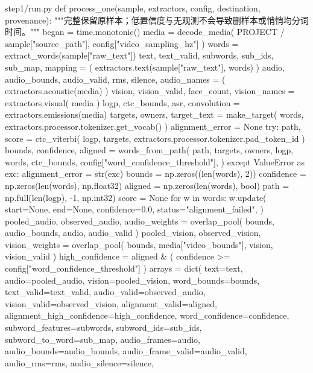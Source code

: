 \begin{appendices}
\begin{Python}{step1/run.py}
def process_one(sample, extractors, config, destination, provenance):
    """完整保留原样本；低置信度与无观测不会导致删样本或悄悄均分词时间。"""
    began = time.monotonic()
    media = decode_media(
        PROJECT / sample["source_path"], config["video_sampling_hz"]
    )
    words = extract_words(sample["raw_text"])
    text, text_valid, subwords, sub_ids, sub_map, mapping = (
        extractors.text(sample["raw_text"], words)
    )
    audio, audio_bounds, audio_valid, rms, silence, audio_names = (
        extractors.acoustic(media)
    )
    vision, vision_valid, face_count, vision_names = extractors.visual(
        media
    )
    logp, ctc_bounds, asr, convolution = extractors.emissions(media)
    targets, owners, target_text = make_target(
        words, extractors.processor.tokenizer.get_vocab()
    )
    alignment_error = None
    try:
        path, score = ctc_viterbi(
            logp, targets, extractors.processor.tokenizer.pad_token_id
        )
        bounds, confidence, aligned = words_from_path(
            path,
            targets,
            owners,
            logp,
            words,
            ctc_bounds,
            config["word_confidence_threshold"],
        )
    except ValueError as exc:
        alignment_error = str(exc)
        bounds = np.zeros((len(words), 2))
        confidence = np.zeros(len(words), np.float32)
        aligned = np.zeros(len(words), bool)
        path = np.full(len(logp), -1, np.int32)
        score = None
        for w in words:
            w.update(
                start=None,
                end=None,
                confidence=0.0,
                status="alignment_failed",
            )
    pooled_audio, observed_audio, audio_weights = overlap_pool(
        bounds, audio_bounds, audio, audio_valid
    )
    pooled_vision, observed_vision, vision_weights = overlap_pool(
        bounds, media["video_bounds"], vision, vision_valid
    )
    high_confidence = aligned & (
        confidence >= config["word_confidence_threshold"]
    )
    arrays = dict(
        text=text,
        audio=pooled_audio,
        vision=pooled_vision,
        word_bounds=bounds,
        text_valid=text_valid,
        audio_valid=observed_audio,
        vision_valid=observed_vision,
        alignment_valid=aligned,
        alignment_high_confidence=high_confidence,
        word_confidence=confidence,
        subword_features=subwords,
        subword_ids=sub_ids,
        subword_to_word=sub_map,
        audio_frames=audio,
        audio_bounds=audio_bounds,
        audio_frame_valid=audio_valid,
        audio_rms=rms,
        audio_silence=silence,

\end{Python}
\end{appendices}

